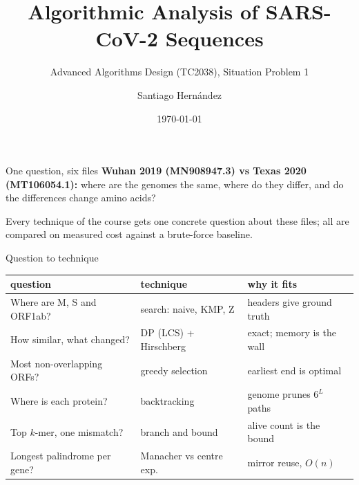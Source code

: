 \documentclass[aspectratio=169,11pt]{beamer}
\title[Algorithmic Analysis of SARS-CoV-2 Sequences]{Algorithmic Analysis of SARS-CoV-2 Sequences}
\subtitle{Advanced Algorithms Design (TC2038), Situation Problem 1}
\author{Santiago Hern\'andez}
\institute{A01787550, Tecnol\'ogico de Monterrey}
\date{\today}
\renewcommand{\arraystretch}{1.1}
\begin{document}
\begin{frame}[plain]
  \titlepage
\end{frame}

\begin{frame}{One question, six files}
  \textbf{Wuhan 2019 (MN908947.3) vs Texas 2020 (MT106054.1):} where are the genomes the same, where do they differ, and do the differences change amino acids?

  \smallskip
  Every technique of the course gets one concrete question about these files; all are compared on measured cost against a brute-force baseline.

  \medskip
  \begin{center}
    \small
    
  \end{center}
\end{frame}

\begin{frame}{Question to technique}
  \small
  \begin{center}
  \setlength{\tabcolsep}{4pt}
  \renewcommand{\arraystretch}{1.35}
  \begin{tabular}{@{}L{5.1cm}L{4.1cm}L{4.8cm}@{}}
    \toprule
    question & technique & why it fits \\
    \midrule
    Where are M, S and ORF1ab? & search: naive, KMP, Z & headers give ground truth \\
    How similar, what changed? & \textcolor{accent}{DP (LCS) + Hirschberg} & exact; memory is the wall \\
    Most non-overlapping ORFs? & greedy selection & earliest end is optimal \\
    Where is each protein? & backtracking & genome prunes $6^L$ paths \\
    Top $k$-mer, one mismatch? & branch and bound & alive count is the bound \\
    Longest palindrome per gene? & Manacher vs centre exp. & mirror reuse, $O(n)$ \\
    \bottomrule
  \end{tabular}
  \end{center}

\end{frame}
\end{document}
